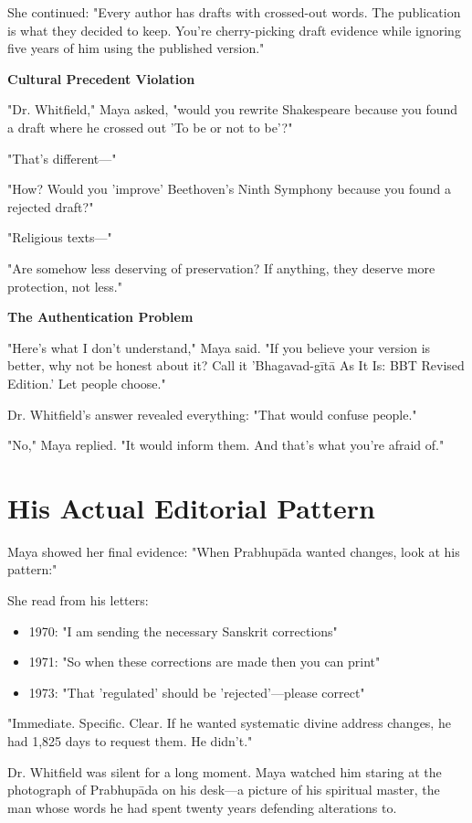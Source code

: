 \documentclass[11pt,twoside]{book}
\begin{document}
She continued: "Every author has drafts with crossed-out words. The publication is what they decided to keep. You're cherry-picking draft evidence while ignoring five years of him using the published version."

\textbf{\textbf{\textbf{Cultural Precedent Violation}}}

"Dr. Whitfield," Maya asked, "would you rewrite Shakespeare because you found a draft where he crossed out 'To be or not to be'?"

"That's different—"

"How? Would you 'improve' Beethoven's Ninth Symphony because you found a rejected draft?"

"Religious texts—"

"Are somehow less deserving of preservation? If anything, they deserve more protection, not less."

\textbf{\textbf{\textbf{The Authentication Problem}}}

"Here's what I don't understand," Maya said. "If you believe your version is better, why not be honest about it? Call it 'Bhagavad-gītā As It Is: BBT Revised Edition.' Let people choose."

Dr. Whitfield's answer revealed everything: "That would confuse people."

"No," Maya replied. "It would inform them. And that's what you're afraid of."
\section*{His Actual Editorial Pattern}
\label{sec:org36a707a}

Maya showed her final evidence: "When Prabhupāda wanted changes, look at his pattern:"

She read from his letters:
\begin{itemize}
\item 1970: "I am sending the necessary Sanskrit corrections"
\item 1971: "So when these corrections are made then you can print"
\item 1973: "That 'regulated' should be 'rejected'—please correct"
\end{itemize}

"Immediate. Specific. Clear. If he wanted systematic divine address changes, he had 1,825 days to request them. He didn't."

Dr. Whitfield was silent for a long moment. Maya watched him staring at the photograph of Prabhupāda on his desk—a picture of his spiritual master, the man whose words he had spent twenty years defending alterations to.
\end{document}
